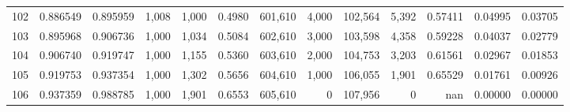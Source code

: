 \begin{tabular}{rrrrrrrrrrrrr}
102 &  0.886549 &  0.895959 &   1,008 &  1,000 &                                     0.4980 &  601,610 &    4,000 &  102,564 &    5,392 &  0.57411 &  0.04995 &  0.03705 \\
103 &  0.895968 &  0.906736 &   1,000 &  1,034 &                                     0.5084 &  602,610 &    3,000 &  103,598 &    4,358 &  0.59228 &  0.04037 &  0.02779 \\
104 &  0.906740 &  0.919747 &   1,000 &  1,155 &                                     0.5360 &  603,610 &    2,000 &  104,753 &    3,203 &  0.61561 &  0.02967 &  0.01853 \\
105 &  0.919753 &  0.937354 &   1,000 &  1,302 &                                     0.5656 &  604,610 &    1,000 &  106,055 &    1,901 &  0.65529 &  0.01761 &  0.00926 \\
106 &  0.937359 &  0.988785 &   1,000 &  1,901 &                                     0.6553 &  605,610 &        0 &  107,956 &        0 &      nan &  0.00000 &  0.00000 \\
\bottomrule
\end{tabular}
